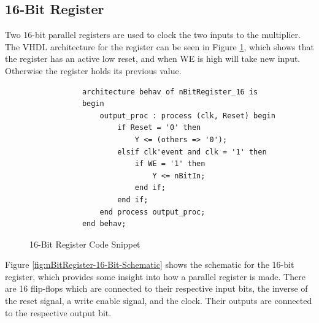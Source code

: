 \documentclass[11pt]{article}
\begin{document}
	\subsection{16-Bit Register}
	
	Two 16-bit parallel registers are used to clock the two inputs to the multiplier. The VHDL architecture for the register can be seen in Figure \ref{code:nBitRegister_16}, which shows that the register has an active low reset, and when WE is high will take new input. Otherwise the register holds its previous value.
	
	\begin{figure}[H]
		\centering
		\begin{verbatim}
            architecture behav of nBitRegister_16 is
            begin
                output_proc : process (clk, Reset) begin
                    if Reset = '0' then
                        Y <= (others => '0');
                    elsif clk'event and clk = '1' then
                        if WE = '1' then
                            Y <= nBitIn;
                        end if;
                    end if;
                end process output_proc;
            end behav;
        \end{verbatim}
        \caption{16-Bit Register Code Snippet} 
    	\label{code:nBitRegister_16} 
    \end{figure}
    
    Figure \ref{fig:nBitRegister-16-Bit-Schematic} shows the schematic for the 16-bit register, which provides some insight into how a parallel register is made. There are 16 flip-flops which are connected to their respective input bits, the inverse of the reset signal, a write enable signal, and the clock. Their outputs are connected to the respective output bit.
\end{document}
